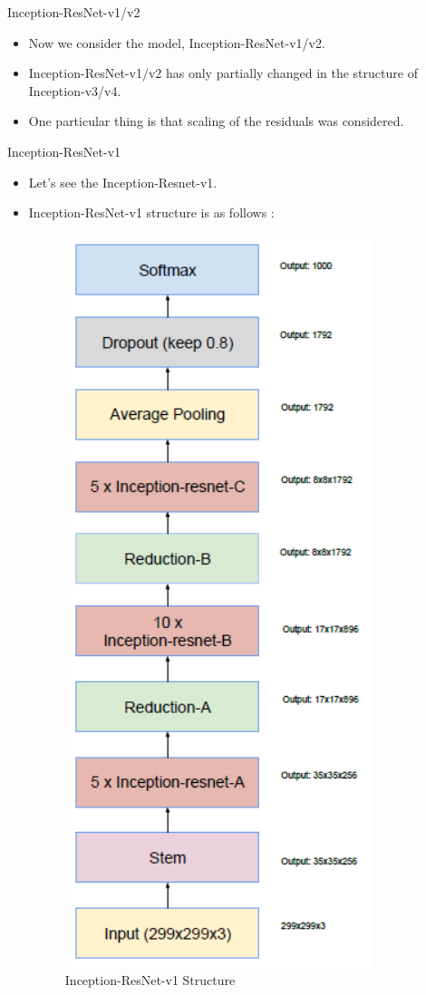 \documentclass{beamer}
\begin{document}
\begin{frame}{Inception-ResNet-v1/v2}
	\begin{itemize}
		\item Now we consider the model, Inception-ResNet-v1/v2.
		\item Inception-ResNet-v1/v2 has only partially changed in the structure of Inception-v3/v4.
		\item One particular thing is that scaling of the residuals was considered.
	\end{itemize}
\end{frame}


\begin{frame}{Inception-ResNet-v1}
	\begin{itemize}
		\item Let's see the Inception-Resnet-v1.
		\item Inception-ResNet-v1 structure is as follows :
		\vspace{7pt}
		\begin{figure}[h]		
			\centering
			\includegraphics[scale=0.3]{./in_res_v1/incep_res_str.PNG}
			\caption{Inception-ResNet-v1 Structure}
			\label{InceptionResNetv1}
		\end{figure}
	\end{itemize}
\end{frame}
\end{document}
